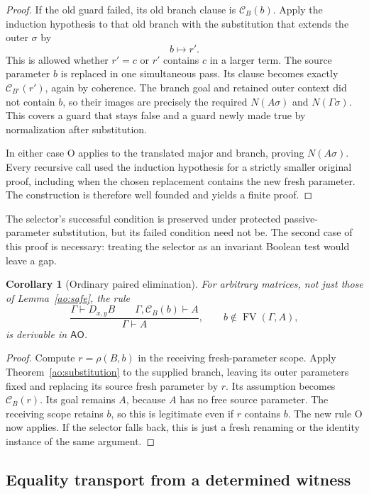 \documentclass[11pt,letterpaper]{article}
\newtheorem{corollary}[theorem]{Corollary}
\theoremstyle{definition}
\begin{document}
\begin{proof}
If the old guard failed, its old branch clause is $\mathcal C_B(b)$.
Apply the induction hypothesis to that old branch with the substitution
that extends the outer $\sigma$ by
\[
                         b\longmapsto r'.
\]
This is allowed whether $r'=c$ or $r'$ contains $c$ in a larger term.
The source parameter $b$ is replaced in one simultaneous pass.  Its
clause becomes exactly $\mathcal C_{B'}(r')$, again by coherence.
The branch goal and retained outer context did not contain $b$, so
their images are precisely the required $N(A\sigma)$ and
$N(\Gamma\sigma)$.  This covers a guard that stays false and a guard
newly made true by normalization after substitution.

In either case O applies to the translated major and branch, proving
$N(A\sigma)$.  Every recursive call used the induction hypothesis for
a strictly smaller original proof, including when the chosen replacement
contains the new fresh parameter.  The construction is therefore well
founded and yields a finite proof.
\end{proof}

The selector's successful condition is preserved under protected passive-
parameter substitution, but its failed condition need not be.  The second
case of this proof is necessary: treating the selector as an invariant
Boolean test would leave a gap.

\begin{corollary}[Ordinary paired elimination]
\label{ao:ordinary-open}
For arbitrary matrices, not just those of Lemma~\ref{ao:safe}, the rule
\[
 \frac{\Gamma\vdash D_{x,y}B\qquad
       \Gamma,\mathcal C_B(b)\vdash A}
      {\Gamma\vdash A},
 \qquad b\notin\operatorname{FV}(\Gamma,A),
\]
is derivable in $\mathsf{AO}$.
\end{corollary}
\begin{proof}
Compute $r=\rho(B,b)$ in the receiving fresh-parameter scope.  Apply
Theorem~\ref{ao:substitution} to the supplied branch, leaving its outer
parameters fixed and replacing its source fresh parameter by $r$.
Its assumption becomes $\mathcal C_B(r)$.  Its goal remains $A$,
because $A$ has no free source parameter.  The receiving scope retains
$b$, so this is legitimate even if $r$ contains $b$.  The new rule O
now applies.  If the selector falls back, this is just a fresh renaming
or the identity instance of the same argument.
\end{proof}

\subsection{Equality transport from a determined witness}
\end{document}
